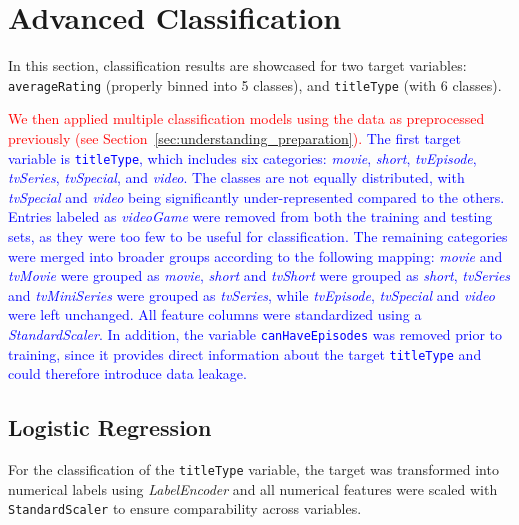 \section{Advanced Classification}
\label{sec:advanced_classification}

In this section, classification results are showcased for two
target variables: \texttt{averageRating} (properly binned into
5 classes), and \texttt{titleType} (with 6 classes).

\textcolor{red}{We then applied multiple classification models using the data as preprocessed previously (see Section~\ref{sec:understanding_preparation}).}   
\textcolor{blue}{The first target variable is \texttt{titleType}, which includes six categories: 
\textit{movie}, \textit{short}, \textit{tvEpisode}, \textit{tvSeries}, 
\textit{tvSpecial}, and \textit{video}. 
The classes are not equally distributed, with \textit{tvSpecial} and \textit{video} 
being significantly under-represented compared to the others. Entries labeled as \textit{videoGame} were removed from both the training and testing sets, 
as they were too few to be useful for classification. 
The remaining categories were merged into broader groups according to the following mapping: 
\textit{movie} and \textit{tvMovie} were grouped as \textit{movie}, 
\textit{short} and \textit{tvShort} were grouped as \textit{short}, 
\textit{tvSeries} and \textit{tvMiniSeries} were grouped as \textit{tvSeries}, 
while \textit{tvEpisode}, \textit{tvSpecial} and \textit{video} were left unchanged. 
All feature columns were standardized using a \textit{StandardScaler}. 
In addition, the variable \texttt{canHaveEpisodes} was removed prior to training, 
since it provides direct information about the target \texttt{titleType} 
and could therefore introduce data leakage.}

\subsection{Logistic Regression}
\label{subsec:logistic}

For the classification of the \texttt{titleType} variable, the target was transformed 
into numerical labels using \textit{LabelEncoder} and all numerical features were scaled 
with \texttt{StandardScaler} to ensure comparability across variables.


